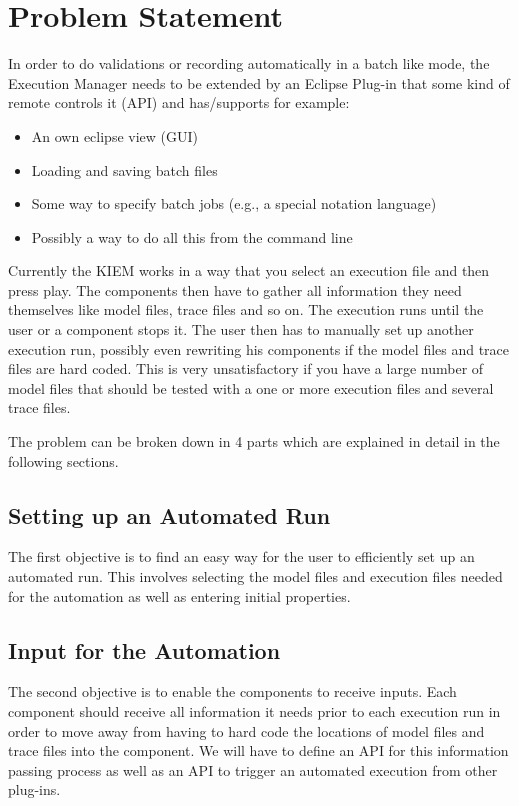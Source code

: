 \chapter{Problem Statement}
\label{chapter:AutoTask}

In order to do validations or recording automatically in a batch like mode, 
the Execution Manager needs to be extended by an Eclipse Plug-in that some kind of 
remote controls it (API) and has/supports for example: 
\begin{itemize}
 \item An own eclipse view (GUI) 
 \item Loading and saving batch files 
 \item Some way to specify batch jobs (e.g., a special notation language) 
 \item Possibly a way to do all this from the command line
\end{itemize}


Currently the KIEM works in a way that you select an execution file and then
press play. The components then have to gather all information they need
themselves like model files, trace files and so on. The execution runs until
the user or a component stops it. The user then has to manually set up another
execution run, possibly even rewriting his components if the model files
and trace files are hard coded.
This is very unsatisfactory if you have a large number of model files that
should be tested with a one or more execution files and several trace files.

The problem can be broken down in 4 parts which are explained in detail in
the following sections.

\section{Setting up an Automated Run}
\label{section:AutoTaskSetup}
The first objective is to find an easy way for the user to efficiently set up an
automated run. This involves selecting the model files and execution files
needed for the automation as well as entering initial properties.

\section{Input for the Automation}
\label{section:AutoTaskInput}
The second objective is to enable the components to receive inputs.
Each component should receive all information it needs prior to each execution
run in order to move away from having to hard code the locations of model files
and trace files into the component.
We will have to define an API for this information passing process as well as
an API to trigger an automated execution from other plug-ins.


